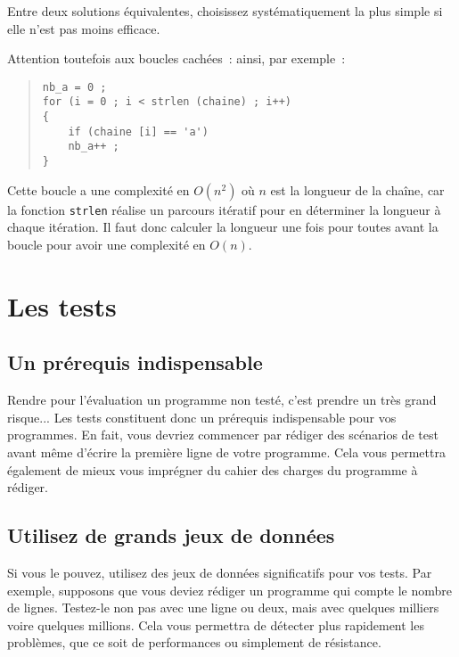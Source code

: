 \documentclass {article}
\begin{document}
Entre deux solutions équivalentes, choisissez systématiquement la plus
simple si elle n'est pas moins efficace.

Attention toutefois aux boucles cachées~: ainsi, par exemple~:

\begin {quote}
\begin {lstlisting}
nb_a = 0 ;
for (i = 0 ; i < strlen (chaine) ; i++)
{
    if (chaine [i] == 'a')
	nb_a++ ;
}
\end{lstlisting}
\end {quote}

Cette boucle a une complexité en $O(n^2)$ où $n$ est la longueur de la
chaîne, car la fonction \texttt {strlen} réalise un parcours itératif
pour en déterminer la longueur à chaque itération. Il faut donc
calculer la longueur une fois pour toutes avant la boucle pour avoir
une complexité en $O(n)$.


\section {Les tests}

\subsection {Un prérequis indispensable}

Rendre pour l'évaluation un programme non testé, c'est prendre un très
grand risque... Les tests constituent donc un prérequis indispensable
pour vos programmes. En fait, vous devriez commencer par rédiger des
scénarios de test avant même d'écrire la première ligne de votre
programme. Cela vous permettra également de mieux vous imprégner du
cahier des charges du programme à rédiger.

\subsection {Utilisez de grands jeux de données}

Si vous le pouvez, utilisez des jeux de données significatifs pour vos
tests. Par exemple, supposons que vous deviez rédiger un programme qui
compte le nombre de lignes. Testez-le non pas avec une ligne ou deux,
mais avec quelques milliers voire quelques millions. Cela vous permettra
de détecter plus rapidement les problèmes, que ce soit de performances
ou simplement de résistance.
\end{document}
